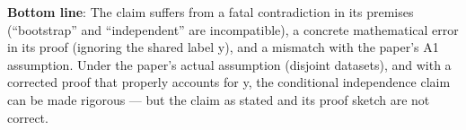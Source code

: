 \documentclass[
  12pt,
]{article}
\begin{document}
\textbf{Bottom line}: The claim suffers from a fatal contradiction in
its premises (``bootstrap'' and ``independent'' are incompatible), a
concrete mathematical error in its proof (ignoring the shared label y),
and a mismatch with the paper's A1 assumption. Under the paper's actual
assumption (disjoint datasets), and with a corrected proof that properly
accounts for y, the conditional independence claim can be made rigorous
--- but the claim as stated and its proof sketch are not correct.
\end{document}
